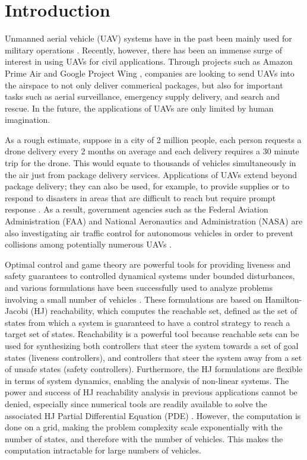 \section{Introduction}
Unmanned aerial vehicle (UAV) systems have in the past been mainly used for military operations \cite{Tice91}. Recently, however, there has been an immense surge of interest in using UAVs for civil applications. Through projects such as Amazon Prime Air \cite{PrimeAir} and Google Project Wing \cite{ProjectWing}, companies are looking to send UAVs into the airspace to not only deliver commerical packages, but also for important tasks such as aerial surveillance, emergency supply delivery, and search and rescue. In the future, the applications of UAVs are only limited by human imagination. 

As a rough estimate, suppose in a city of 2 million people, each person requests a drone delivery every 2 months on average and each delivery requires a 30 minute trip for the drone. This would equate to thousands of vehicles simultaneously in the air just from package delivery services. Applications of UAVs extend beyond package delivery; they can also be used, for example, to provide supplies or to respond to disasters in areas that are difficult to reach but require prompt response \cite{Debusk10,Tornado16}. As a result, government agencies such as the Federal Aviation Administration (FAA) and National Aeronautics and Administration (NASA) are also investigating air traffic control for autonomous vehicles in order to prevent collisions among potentially numerous UAVs \cite{FAA13, NASA16}. 

Optimal control and game theory are powerful tools for providing liveness and safety guarantees to controlled dynamical systems under bounded disturbances, and various formulations \cite{Bokanowski10,Mitchell05,Barron89} have been successfully used to analyze problems involving a small number of vehicles \cite{Fisac15,Chen14,Ding08}. These formulations are based on Hamilton-Jacobi (HJ) reachability, which computes the reachable set, defined as the set of states from which a system is guaranteed to have a control strategy to reach a target set of states. Reachability is a powerful tool because reachable sets can be used for synthesizing both controllers that steer the system towards a set of goal states (liveness controllers), and controllers that steer the system away from a set of unsafe states (safety controllers). Furthermore, the HJ formulations are flexible in terms of system dynamics, enabling the analysis of non-linear systems. The power and success of HJ reachability analysis in previous applications cannot be denied, especially since numerical tools are readily available to solve the associated HJ Partial Differential Equation (PDE) \cite{LSToolbox,Osher02,Sethian96}. However, the computation is done on a grid, making the problem complexity scale exponentially with the number of states, and therefore with the number of vehicles. This makes the computation intractable for large numbers of vehicles. 

